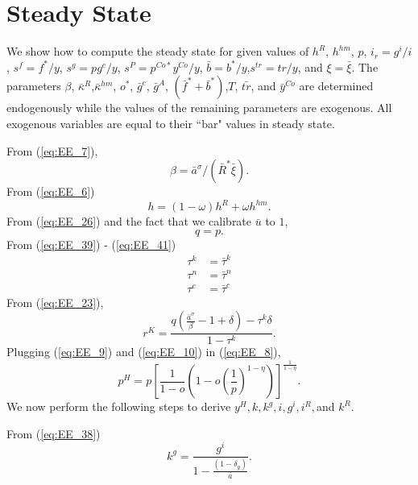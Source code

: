 \documentclass[12pt]{article}
\begin{document}
\section{Steady State}
\label{Appendix:steadystate}

We show how to compute the steady state for given values of $h^R$, $h^{hm}$, $p$, $i_r = g^i/i$, $s^{f}=f^*/y$, $s^{g}=pg^c/y$, $s^P=p^{Co\ast }y^{Co}/y$, $\bar{b}=b^{\ast}/y $,$s^{tr} = tr/y$, and $\xi = \bar{\xi}$. The parameters $\beta $, $\bar{\kappa}^R$,$\bar{\kappa}^{hm}$, $o^{\ast }$, $\bar{g}^c$, $\bar{g}^A$, $(\bar{f}^{\ast} + \bar{b}^{\ast})$,$T$, $\bar{tr}$, and $%
\bar{y}^{Co}$ are determined endogenously while the values of the remaining
parameters are exogenous. All exogenous variables are equal to their ``bar" values in steady state.

\noindent From (\ref{eq:EE_7}),%
\begin{equation*}
\beta =\bar{a}^{\sigma }/(\bar{R}^{\ast }\bar{\xi} ).
\end{equation*}%
From (\ref{eq:EE_6})
\begin{equation*}
 h = (1-\omega)h^R + \omega h^{hm}.   
\end{equation*}
From (\ref{eq:EE_26}) and the fact that we calibrate $\bar{u}$ to $1$,%
\begin{equation*}
q=p.
\end{equation*}%
\noindent From (\ref{eq:EE_39}) - (\ref{eq:EE_41})
\begin{align*}
\tau^k &= \bar{\tau}^k\\
\tau^n &= \bar{\tau}^n\\
\tau^c &= \bar{\tau}^c
\end{align*}
From (\ref{eq:EE_23}),%
\begin{equation*}
r^{K}=\frac{q\left( \frac{\bar{a}^{\sigma }}{\beta }-1+\delta \right)-\tau^k\delta}{1-\tau^k}.
\end{equation*}%
Plugging (\ref{eq:EE_9}) and (\ref{eq:EE_10}) in (\ref{eq:EE_8}),
\begin{equation*}
p^H = p\left[\frac{1}{1-o}\left(1-o\left(\frac{1}{p}\right)^{1-\eta}\right)\right]^{\frac{1}{1-\eta}}.
\end{equation*}%
We now perform the following steps to derive $y^H,k,k^g,i,g^i,i^R,$and $k^R.$

\noindent From (\ref{eq:EE_38})
\begin{equation*}
k^g = \frac{g^i}{1-\frac{(1-\delta_g)}{\bar{a}}}.
\end{equation*}%
\end{document}
